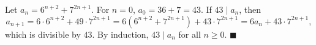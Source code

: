 Let $a_n=6^{n+2}+7^{2n+1}$. For $n=0$, $a_0=36+7=43$. If $43\mid a_n$, then
\[a_{n+1}=6\cdot6^{n+2}+49\cdot7^{2n+1}=6\left(6^{n+2}+7^{2n+1}\right)+43\cdot7^{2n+1}=6a_n+43\cdot7^{2n+1},\]
which is divisible by $43$. By induction, $43\mid a_n$ for all $n\ge0$. $\blacksquare$
